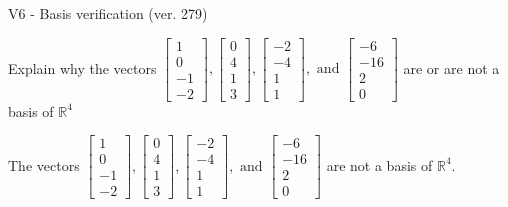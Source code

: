 \begin{exercise}
  \begin{exerciseTitle}V6 - Basis verification (ver. 279)\end{exerciseTitle}
  \begin{exerciseStatement}
    Explain why the vectors \(\left[\begin{array}{r}
1 \\
0 \\
-1 \\
-2
\end{array}\right] , \left[\begin{array}{r}
0 \\
4 \\
1 \\
3
\end{array}\right] , \left[\begin{array}{r}
-2 \\
-4 \\
1 \\
1
\end{array}\right] , \text{ and } \left[\begin{array}{r}
-6 \\
-16 \\
2 \\
0
\end{array}\right]\) are or are not a basis of \(\mathbb{R}^4\)	


  \end{exerciseStatement}
  \begin{exerciseAnswer}
   The vectors \(\left[\begin{array}{r}
1 \\
0 \\
-1 \\
-2
\end{array}\right] , \left[\begin{array}{r}
0 \\
4 \\
1 \\
3
\end{array}\right] , \left[\begin{array}{r}
-2 \\
-4 \\
1 \\
1
\end{array}\right] , \text{ and } \left[\begin{array}{r}
-6 \\
-16 \\
2 \\
0
\end{array}\right]\) 
  	 are not  a basis of \(\mathbb{R}^4\).
  


  \end{exerciseAnswer}
\end{exercise}